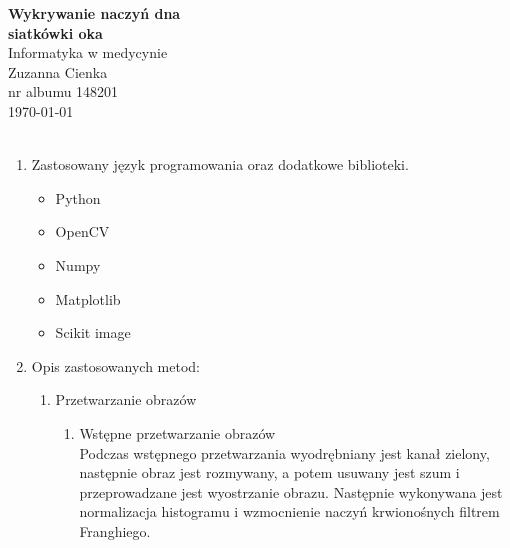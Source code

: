 \documentclass{article}
\begin{document}
\begin{center}\vspace{-1cm}
    \textbf{ \Huge Wykrywanie naczyń dna \\siatkówki oka}\\
    \LARGE Informatyka w medycynie\\
    \Large Zuzanna Cienka  \\
    \large nr albumu 148201\\
    \large \today \\~\\
\end{center}

\begin{enumerate}

    \item Zastosowany język programowania oraz dodatkowe biblioteki.
          \begin{itemize}
              \item Python
              \item OpenCV
              \item Numpy
              \item Matplotlib
              \item Scikit image
          \end{itemize}
    \item Opis zastosowanych metod:
          \begin{enumerate}
              \item Przetwarzanie obrazów
                    \begin{enumerate}
                        \item Wstępne przetwarzanie obrazów\\
                              Podczas wstępnego przetwarzania wyodrębniany jest kanał zielony,
                              następnie obraz jest rozmywany, a potem usuwany jest szum i przeprowadzane jest
                              wyostrzanie obrazu. Następnie wykonywana jest normalizacja histogramu i
                              wzmocnienie naczyń krwionośnych filtrem Franghiego.
                              \begin{figure}[h]
                                  \centering
                                  \begin{minipage}{0.47\textwidth}
                                      \centering

\end{minipage}
\end{figure}
\end{enumerate}
\end{enumerate}
\end{enumerate}
\end{document}
